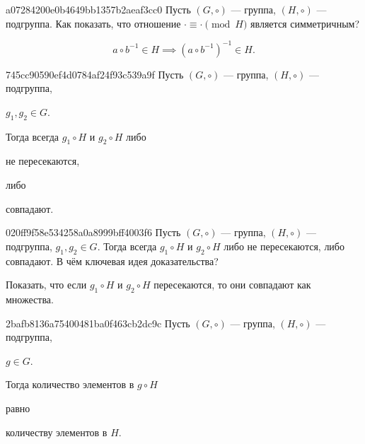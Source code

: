 \begin{note}{a07284200e0b4649bb1357b2aeaf3cc0}
    Пусть \({ (G, \circ) }\) --- группа, \({ (H, \circ) }\) --- подгруппа.
    Как показать, что отношение \({ \cdot \equiv \cdot \pmod{H} }\) является симметричным?

    \begin{cloze}{1}
        \[
            a \circ b^{-1} \in H \implies (a \circ b^{-1})^{-1} \in H.
        \]
    \end{cloze}
\end{note}

\begin{note}{745cc90590ef4d0784af24f93c539a9f}
    Пусть \({ (G, \circ) }\) --- группа, \({ (H, \circ) }\) --- подгруппа,\: \begin{icloze}{2}\({ g_1, g_2 \in G }\).\end{icloze}
    Тогда всегда \({ g_1 \circ H }\) и \({ g_2 \circ H }\) либо \begin{icloze}{1}не пересекаются,\end{icloze} либо \begin{icloze}{1}совпадают.\end{icloze}
\end{note}

\begin{note}{020ff9f58e534258a0a8999bff4003f6}
    Пусть \({ (G, \circ) }\) --- группа, \({ (H, \circ) }\) --- подгруппа,\: \({ g_1, g_2 \in G }\).
    Тогда всегда \({ g_1 \circ H }\) и \({ g_2 \circ H }\) либо не пересекаются, либо совпадают.
    В чём ключевая идея доказательства?

    \begin{cloze}{1}
        Показать, что если \({ g_1 \circ H }\) и \({ g_2 \circ H }\) пересекаются, то они совпадают как множества.
    \end{cloze}
\end{note}

\begin{note}{2bafb8136a75400481ba0f463cb2dc9c}
    Пусть \({ (G, \circ) }\) --- группа, \({ (H, \circ) }\) --- подгруппа,\: \begin{icloze}{3}\({ g \in G }\).\end{icloze}
    \begin{icloze}{2}Тогда количество элементов в \({ g \circ H }\)\end{icloze} равно \begin{icloze}{1}количеству элементов в \({ H }\).\end{icloze}
\end{note}


